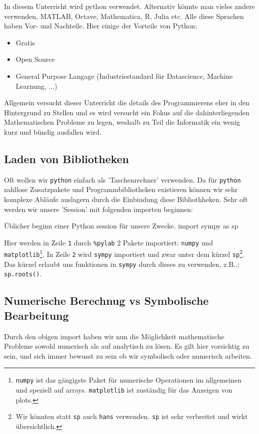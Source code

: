 In diesem Unterricht wird python verwendet. Alternativ könnte man vieles andere verwenden, MATLAB, Octave,  Mathematica, R, Julia etc. Alle diese Sprachen haben Vor- und Nachteile. Hier einige der Vorteile von Python:
\begin{itemize}
	\item Gratis
	\item Open Source
	\item General Purpose Langage (Industriestandard für Datascience, Machine Learnung, ...) 
\end{itemize}
Allgemein versucht dieser Unterricht die details des Programmierens eher in den Hintergrund zu Stellen und es wird versucht ein Fokus auf die dahinterliegenden Mathematischen Probleme zu legen, weshalb zu Teil die Informatik ein wenig kurz und bündig ausfallen wird. 

\subsection{Laden von Bibliotheken}
Oft wollen wir \texttt{python} einfach als 'Taschenrechner' verwenden. Da für \texttt{python} zahllose Zusatzpakete und Programmbibliotheken existieren können wir sehr komplexe Abläufe auslagern durch die Einbindung diese Bibliothheken. Sehr oft werden wir unsere 'Session' mit folgenden importen beginnen:

\begin{python}{Üblicher beginn einer Python session für unsere Zwecke.}
import sympy as sp
\end{python}
Hier werden in Zeile \texttt{1} durch \texttt{\%pylab} 2 Pakete importiert: \texttt{numpy} und \texttt{matplotlib}\footnote{\texttt{numpy} ist das gängigste Paket für numerische Operationen im allgemeinen und speziell auf arrays. \texttt{matplotlib} ist zuständig für das Anzeigen von plots.}. In Zeile \texttt{2} wird \texttt{sympy} importiert und zwar unter dem kürzel \texttt{sp}\footnote{Wir könnten statt \texttt{sp} auch \texttt{hans} verwenden. \texttt{sp} ist sehr verbreitet und wirkt übersichtlich.}. Das kürzel erlaubt uns funktionen in \texttt{sympy} durch dieses zu verwenden, z.B..: \texttt{sp.roots()}. \\


\subsection{Numerische Berechnug vs Symbolische Bearbeitung}

Durch den obigen import haben wir nun die Möglichkeit mathematische Probleme sowohl numerisch als auf analytisch zu lösen. Es gilt hier vorsichtig zu sein, und sich immer bewusst zu sein ob wir symbolisch oder numerisch arbeiten. 


